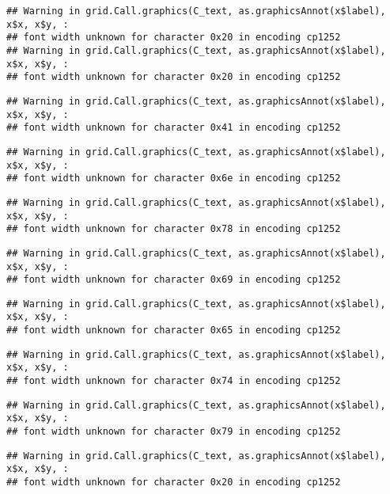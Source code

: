 \documentclass[
]{article}
\begin{document}
\begin{verbatim}
## Warning in grid.Call.graphics(C_text, as.graphicsAnnot(x$label), x$x, x$y, :
## font width unknown for character 0x20 in encoding cp1252
## Warning in grid.Call.graphics(C_text, as.graphicsAnnot(x$label), x$x, x$y, :
## font width unknown for character 0x20 in encoding cp1252
\end{verbatim}

\begin{verbatim}
## Warning in grid.Call.graphics(C_text, as.graphicsAnnot(x$label), x$x, x$y, :
## font width unknown for character 0x41 in encoding cp1252
\end{verbatim}

\begin{verbatim}
## Warning in grid.Call.graphics(C_text, as.graphicsAnnot(x$label), x$x, x$y, :
## font width unknown for character 0x6e in encoding cp1252
\end{verbatim}

\begin{verbatim}
## Warning in grid.Call.graphics(C_text, as.graphicsAnnot(x$label), x$x, x$y, :
## font width unknown for character 0x78 in encoding cp1252
\end{verbatim}

\begin{verbatim}
## Warning in grid.Call.graphics(C_text, as.graphicsAnnot(x$label), x$x, x$y, :
## font width unknown for character 0x69 in encoding cp1252
\end{verbatim}

\begin{verbatim}
## Warning in grid.Call.graphics(C_text, as.graphicsAnnot(x$label), x$x, x$y, :
## font width unknown for character 0x65 in encoding cp1252
\end{verbatim}

\begin{verbatim}
## Warning in grid.Call.graphics(C_text, as.graphicsAnnot(x$label), x$x, x$y, :
## font width unknown for character 0x74 in encoding cp1252
\end{verbatim}

\begin{verbatim}
## Warning in grid.Call.graphics(C_text, as.graphicsAnnot(x$label), x$x, x$y, :
## font width unknown for character 0x79 in encoding cp1252
\end{verbatim}

\begin{verbatim}
## Warning in grid.Call.graphics(C_text, as.graphicsAnnot(x$label), x$x, x$y, :
## font width unknown for character 0x20 in encoding cp1252
\end{verbatim}
\end{document}

